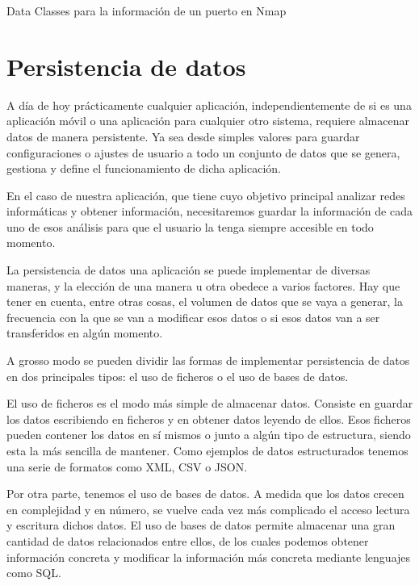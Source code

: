 \begin{code}
	\caption{Data Classes para la información de un puerto en Nmap}
	\label{code:nmapPort}
	
\end{code}

\section{Persistencia de datos}

A día de hoy prácticamente cualquier aplicación, independientemente de si es una aplicación móvil o una aplicación para cualquier otro sistema, requiere almacenar datos de manera persistente. Ya sea desde simples valores para guardar configuraciones o ajustes de usuario a todo un conjunto de datos que se genera, gestiona y define el funcionamiento de dicha aplicación.

En el caso de nuestra aplicación, que tiene cuyo objetivo principal analizar redes informáticas y obtener información, necesitaremos guardar la información de cada uno de esos análisis para que el usuario la tenga siempre accesible en todo momento.

La persistencia de datos una aplicación se puede implementar de diversas maneras, y la elección de una manera u otra obedece a varios factores. Hay que tener en cuenta, entre otras cosas, el volumen de datos que se vaya a generar, la frecuencia con la que se van a modificar esos datos o si esos datos van a ser transferidos en algún momento.

A grosso modo se pueden dividir las formas de implementar persistencia de datos en dos principales tipos: el uso de ficheros o el uso de bases de datos.

El uso de ficheros es el modo más simple de almacenar datos. Consiste en guardar los datos escribiendo en ficheros y en obtener datos leyendo de ellos. Esos ficheros pueden contener los datos en sí mismos o junto a algún tipo de estructura, siendo esta la más sencilla de mantener. Como ejemplos de datos estructurados tenemos una serie de formatos como XML, CSV o JSON.

Por otra parte, tenemos el uso de bases de datos. A medida que los datos crecen en complejidad y en número, se vuelve cada vez más complicado el acceso lectura y escritura dichos datos. El uso de bases de datos permite almacenar una gran cantidad de datos relacionados entre ellos, de los cuales podemos obtener información concreta y modificar la información más concreta mediante lenguajes como SQL.

